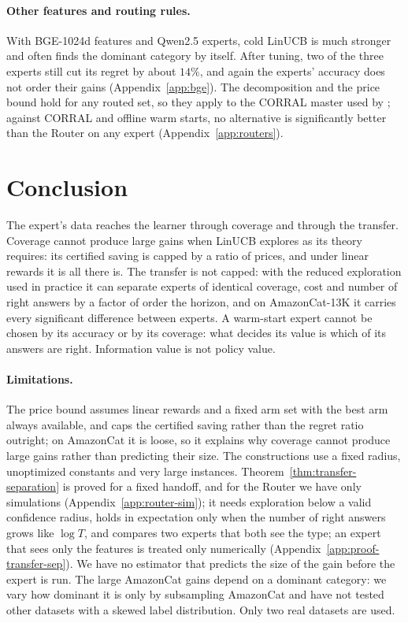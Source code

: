 \documentclass[anon]{alt2027} %
\begin{document}
\paragraph{Other features and routing rules.}
With BGE-1024d features and Qwen2.5 experts, cold LinUCB is much stronger and
often finds the dominant category by itself. After tuning, two of the three
experts still cut its regret by about $14\%$, and again the experts' accuracy
does not order their gains (Appendix~\ref{app:bge}). The decomposition and the
price bound hold for any routed set, so they apply to the CORRAL master
\citep{agarwal2017corralling} used by \citet{chen2024llmdecision}; against
CORRAL and offline warm starts, no alternative is significantly better than
the Router on any expert (Appendix~\ref{app:routers}).

\section{Conclusion}
\label{sec:conclusion}

The expert's data reaches the learner through coverage and through the
transfer. Coverage cannot produce large gains when LinUCB explores as its
theory requires: its certified saving is capped by a ratio of prices, and
under linear rewards it is all there is. The transfer is not capped: with the
reduced exploration used in practice it can separate experts of identical
coverage, cost and number of right answers by a factor of order the horizon,
and on AmazonCat-13K it carries every significant difference between experts.
A warm-start expert cannot be chosen by its accuracy or by its coverage: what
decides its value is which of its answers are right. Information value is not
policy value.

\paragraph{Limitations.}
The price bound assumes linear rewards and a fixed arm set with the best arm
always available, and caps the certified saving rather than the regret ratio
outright; on AmazonCat it is loose, so it explains why coverage cannot produce
large gains rather than predicting their size. The constructions use a fixed
radius, unoptimized constants and very large instances.
Theorem~\ref{thm:transfer-separation} is proved for a fixed handoff, and
for the Router we have only simulations (Appendix~\ref{app:router-sim}); it
needs exploration below a valid confidence radius, holds in expectation only when the number of right
answers grows like $\log T$, and compares two experts that both see the type;
an expert that sees only the features is treated only numerically
(Appendix~\ref{app:proof-transfer-sep}). We have no estimator that predicts
the size of the gain before the expert is run. The large AmazonCat gains
depend on a dominant category: we vary how dominant it is only by
subsampling AmazonCat and have not tested other datasets with a skewed label
distribution. Only two real datasets are used.
\end{document}
